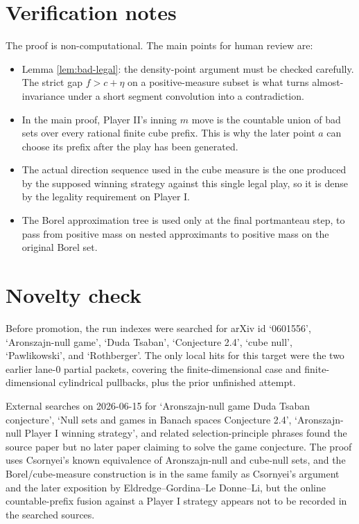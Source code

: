 \documentclass[11pt]{amsart}
\begin{document}
\section*{Verification notes}

The proof is non-computational.  The main points for human review are:
\begin{itemize}
\item Lemma \ref{lem:bad-legal}: the density-point argument must be checked
  carefully.  The strict gap \(f>c+\eta\) on a positive-measure subset is what
  turns almost-invariance under a short segment convolution into a contradiction.
\item In the main proof, Player II's inning \(m\) move is the countable union of
  bad sets over every rational finite cube prefix.  This is why the later point
  \(a\) can choose its prefix after the play has been generated.
\item The actual direction sequence used in the cube measure is the one
  produced by the supposed winning strategy against this single legal play, so
  it is dense by the legality requirement on Player I.
\item The Borel approximation tree is used only at the final portmanteau step,
  to pass from positive mass on nested approximants to positive mass on the
  original Borel set.
\end{itemize}

\section*{Novelty check}

Before promotion, the run indexes were searched for arXiv id `0601556',
`Aronszajn-null game', `Duda Tsaban', `Conjecture 2.4', `cube null',
`Pawlikowski', and `Rothberger'.  The only local hits for this target were the
two earlier lane-0 partial packets, covering the finite-dimensional case and
finite-dimensional cylindrical pullbacks, plus the prior unfinished attempt.

External searches on 2026-06-15 for `Aronszajn-null game Duda Tsaban
conjecture', `Null sets and games in Banach spaces Conjecture 2.4',
`Aronszajn-null Player I winning strategy', and related selection-principle
phrases found the source paper but no later paper claiming to solve the game
conjecture.  The proof uses Csornyei's known equivalence of Aronszajn-null and
cube-null sets, and the Borel/cube-measure construction is in the same family
as Csornyei's argument and the later exposition by Eldredge--Gordina--Le
Donne--Li, but the online countable-prefix fusion against a Player I strategy
appears not to be recorded in the searched sources.
\end{document}
